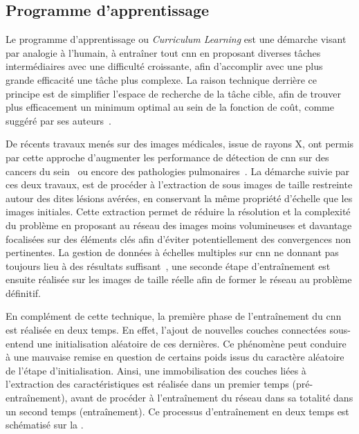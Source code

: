 \subsection{Programme d'apprentissage}
Le programme d'apprentissage ou \textit{Curriculum Learning} est une démarche visant par analogie à l'humain, à entraîner tout \gls{cnn} en proposant diverses tâches intermédiaires avec une difficulté croissante, afin d'accomplir avec une plus grande efficacité une tâche plus complexe. La raison technique derrière ce principe est de simplifier l'espace de recherche de la tâche cible, afin de trouver plus efficacement un minimum optimal au sein de la fonction de coût, comme suggéré par ses auteurs~\cite{Bengio2009}.\par

De récents travaux menés sur des images médicales, issue de rayons X, ont permis par cette approche d'augmenter les performance de détection de \gls{cnn} sur des cancers du sein~\cite{Lotter2017} ou encore des pathologies pulmonaires~\cite{Park2019}. La démarche suivie par ces deux travaux, est de procéder à l'extraction de sous images de taille restreinte autour des dites lésions avérées, en conservant la même propriété d'échelle que les images initiales. Cette extraction permet de réduire la résolution et la complexité du problème en proposant au réseau des images moins volumineuses et davantage focalisées sur des éléments clés afin d'éviter potentiellement des convergences non pertinentes. La gestion de données à échelles multiples sur \gls{cnn} ne donnant pas toujours lieu à des résultats suffisant~\cite{Noord2017}, une seconde étape d'entraînement est ensuite réalisée sur les images de taille réelle afin de former le réseau au problème définitif.\par

En complément de cette technique, la première phase de l'entraînement du \gls{cnn} est réalisée en deux temps. En effet, l'ajout de nouvelles couches connectées sous-entend une initialisation aléatoire de ces dernières. Ce phénomène peut conduire à une mauvaise remise en question de certains poids issus du caractère aléatoire de l'étape d'initialisation. Ainsi, une immobilisation des couches liées à l'extraction des caractéristiques est réalisée dans un premier temps (pré-entraînement), avant de procéder à l'entraînement du réseau dans sa totalité dans un second temps (entraînement). Ce processus d'entraînement en deux temps est schématisé sur la .\par

